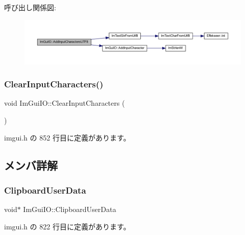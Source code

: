 呼び出し関係図\+:\nopagebreak
\begin{figure}[H]
\begin{center}
\leavevmode
\includegraphics[width=350pt]{struct_im_gui_i_o_adaf150a1908c02c3cae15a35915bbb26_cgraph}
\end{center}
\end{figure}
\mbox{\label{struct_im_gui_i_o_a82d8794e14e628efbb026af4202c70ca}} 
\subsubsection{\texorpdfstring{Clear\+Input\+Characters()}{ClearInputCharacters()}}
{\footnotesize\ttfamily void Im\+Gui\+I\+O\+::\+Clear\+Input\+Characters (\begin{DoxyParamCaption}{ }\end{DoxyParamCaption})\hspace{0.3cm}{\ttfamily [inline]}}



 imgui.\+h の 852 行目に定義があります。



\subsection{メンバ詳解}
\mbox{\label{struct_im_gui_i_o_a162d9da988e8985df05d262640f2f91c}} 
\subsubsection{\texorpdfstring{Clipboard\+User\+Data}{ClipboardUserData}}
{\footnotesize\ttfamily void$\ast$ Im\+Gui\+I\+O\+::\+Clipboard\+User\+Data}



 imgui.\+h の 822 行目に定義があります。

